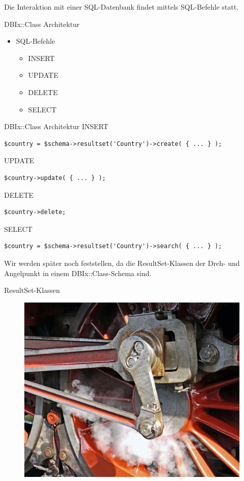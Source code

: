 Die Interaktion mit einer SQL-Datenbank findet mittels SQL-Befehle statt.

\begin{frame}{DBIx::Class Architektur}
  \begin{itemize}
  \item SQL-Befehle
    \begin{itemize}
    \item INSERT
    \item UPDATE
    \item DELETE
    \item SELECT
    \end{itemize}
  \end{itemize}
\end{frame}

\begin{frame}[fragile]{DBIx::Class Architektur}
  INSERT
  \begin{lstlisting}
$country = $schema->resultset('Country')->create( { ... } );
  \end{lstlisting}
  UPDATE
  \begin{lstlisting}
$country->update( { ... } );
  \end{lstlisting}
  DELETE
  \begin{lstlisting}
$country->delete;
  \end{lstlisting}
  SELECT
   \begin{lstlisting}
$country = $schema->resultset('Country')->search( { ... } );
  \end{lstlisting}
\end{frame}


Wir werden später noch feststellen, da die ResultSet-Klassen der Dreh- und Angelpunkt in einem DBIx::Class-Schema sind.

\begin{frame}{ResultSet-Klassen}
\begin{figure}[!ht]
\centering
\includegraphics[width=1\linewidth]{img/pivot.jpg}
\end{figure}
\end{frame}

